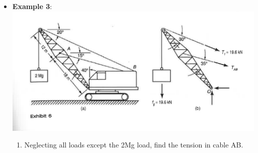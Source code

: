 \documentclass[11pt]{article}
\begin{document}
\begin{itemize}
\newpage		
	\item  \textbf{\LARGE Example 3}:\\
\includegraphics[scale=.5]{lecture1_fig3.png}
		\LARGE
				\begin{enumerate}
			\item Neglecting all loads except the 2Mg load, find the tension in cable AB.\\



		\end{enumerate}

		
\end{itemize}
\newpage

	
\end{document}
